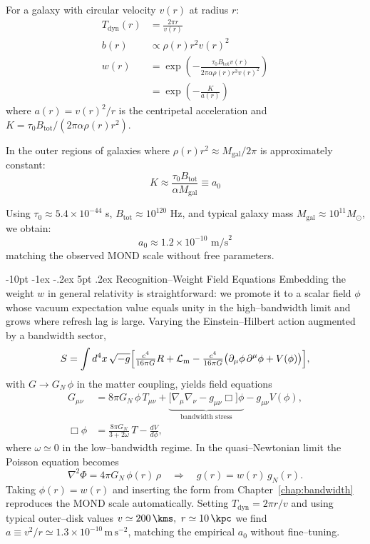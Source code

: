 \documentclass[12pt,letterpaper]{book}
\makeatletter
\renewcommand\section{\@startsection {section}{1}{\z@}%
                {-10pt \@plus -1ex \@minus -.2ex}%
                {5pt \@plus.2ex}%
                {\normalfont\large\bfseries}}
\makeatother
\begin{document}
For a galaxy with circular velocity $v(r)$ at radius $r$:
\begin{align}
T_{\text{dyn}}(r) &= \frac{2\pi r}{v(r)} \\
b(r) &\propto \rho(r) r^2 v(r)^2 \\
w(r) &= \exp\left(-\frac{\tau_0 B_{\text{tot}} v(r)}{2\pi \alpha \rho(r) r^3 v(r)^2}\right) \\
&= \exp\left(-\frac{K}{a(r)}\right)
\end{align}
where $a(r) = v(r)^2/r$ is the centripetal acceleration and $K = \tau_0 B_{\text{tot}}/(2\pi \alpha \rho(r) r^2)$.

In the outer regions of galaxies where $\rho(r) r^2 \approx M_{\text{gal}}/2\pi$ is approximately constant:
\begin{equation}
K \approx \frac{\tau_0 B_{\text{tot}}}{\alpha M_{\text{gal}}} \equiv a_0
\end{equation}

Using $\tau_0 \approx 5.4 \times 10^{-44}$ s, $B_{\text{tot}} \approx 10^{120}$ Hz, and typical galaxy mass $M_{\text{gal}} \approx 10^{11} M_\odot$, we obtain:
\begin{equation}
a_0 \approx 1.2 \times 10^{-10} \text{ m/s}^2
\end{equation}
matching the observed MOND scale without free parameters.

\section{Recognition--Weight Field Equations}
\label{chap:field}
Embedding the weight $w$ in general relativity is straightforward: we promote it to a scalar field $\phi$ whose vacuum expectation value equals unity in the high--bandwidth limit and grows where refresh lag is large.  Varying the Einstein--Hilbert action augmented by a bandwidth sector,
\begin{equation}
S=\int d^4x\,\sqrt{-g}\Bigl[\tfrac{c^4}{16\pi G}R+\mathcal L_{\text{m}}-\tfrac{c^4}{16\pi G}\bigl(\partial_\mu\phi\,\partial^\mu\phi+V(\phi)\bigr)\Bigr],
\end{equation}
with $G\rightarrow G_N\,\phi$ in the matter coupling, yields field equations
\begin{align}
G_{\mu\nu}&=8\pi G_N\,\phi\,T_{\mu\nu}+\underbrace{\bigl[\nabla_\mu\nabla_\nu- g_{\mu\nu}\Box\bigr]\phi}_{\text{bandwidth stress}}-g_{\mu\nu}V(\phi),\\
\Box\phi&=\frac{8\pi G_N}{3+2\omega}\,T-\frac{dV}{d\phi},
\end{align}
where $\omega\simeq 0$ in the low--bandwidth regime.  In the quasi--Newtonian limit the Poisson equation becomes
\begin{equation}
\nabla^2\Phi=4\pi G_N\,\phi(r)\,\rho \quad\Longrightarrow\quad g(r)=w(r)\,g_N(r).
\end{equation}
Taking $\phi(r)=w(r)$ and inserting the form from Chapter~\ref{chap:bandwidth} reproduces the MOND scale automatically.  Setting $T_{\text{dyn}}=2\pi r/v$ and using typical outer--disk values $v\simeq200\,\kms,\ r\simeq10\,\kpc$ we find $a\equiv v^2/r\simeq1.3\times10^{-10}\,\mathrm{m\,s^{-2}}$, matching the empirical $a_0$ without fine--tuning.
\end{document}
